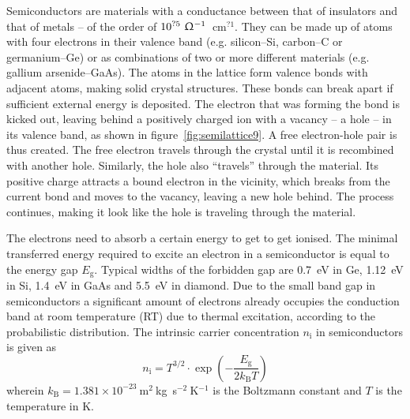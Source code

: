 Semiconductors are materials with a conductance between that of insulators and that of metals -- of the order of  $10^{?5}~\Upomega^{-1}$~cm$^{?1}$. They can be made up of atoms with four electrons in their valence band (e.g. silicon--Si, carbon--C or germanium--Ge) or as combinations of two or more different materials (e.g. gallium arsenide--GaAs). The atoms in the lattice form valence bonds with adjacent atoms, making solid crystal structures. These bonds can break apart if sufficient external energy is deposited. The electron that was forming the bond is kicked out, leaving behind a positively charged ion with a vacancy -- a hole -- in its valence band, as shown in figure~\ref{fig:semilattice9}. A free electron-hole pair is thus created. The free electron travels through the crystal until it is recombined with another hole. Similarly, the hole also ``travels'' through the material. Its positive charge attracts a bound electron in the vicinity, which breaks from the current bond and moves to the vacancy, leaving a new hole behind. The process continues, making it look like the hole is traveling through the material.




The electrons need to absorb a certain energy to get to get ionised. The minimal transferred energy required to excite an electron in a semiconductor is equal to the energy gap $E_\mathrm{g}$. Typical widths of the forbidden gap are 0.7~eV in Ge, 1.12~eV in Si, 1.4~eV in GaAs and 5.5~eV in diamond. Due to the small band gap in semiconductors a significant amount of electrons already occupies the conduction band at room temperature (RT) due to thermal excitation, according to the probabilistic distribution. The intrinsic carrier concentration $n_\mathrm{i}$ in semiconductors is given as
\begin{equation}
\label{eq:intrinsiccarrier}
n_\mathrm{i} = T^{3/2} \cdot \exp\left(-\frac{E_\mathrm{g}}{2k_\mathrm{B}T}\right)
\end{equation} 
wherein $k_\mathrm{B} = 1.381\times10^{-23}~$m$^2~$kg~s$^{-2}~$K$^{-1}$ is the Boltzmann constant and $T$ is the temperature in K. 

